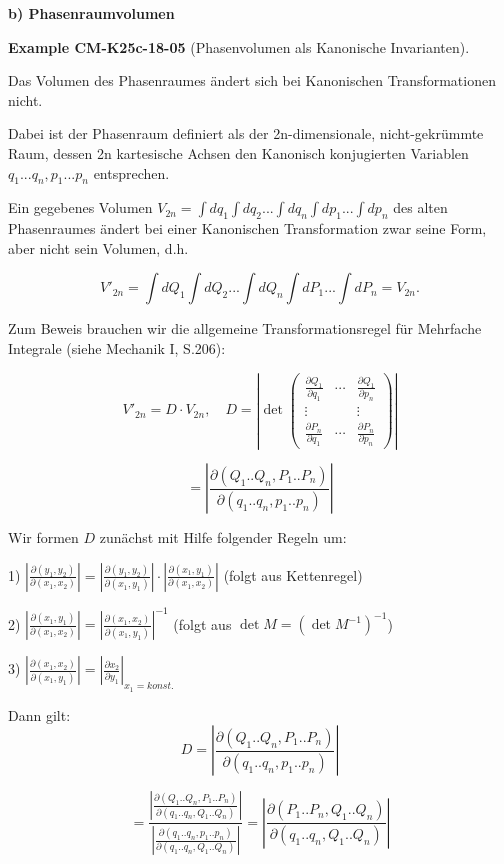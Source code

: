 \documentclass[10pt, letterpaper]{article}
\newcommand{\CustomHeading}[3]{%
  \par\medskip\noindent%
  \textbf{#1 #2} \textnormal{(#3)}.\enskip%
}
\newenvironment{EXA}[2]{\begin{unitbox}\CustomHeading{Example}{#1}{#2}}{\end{unitbox}}
\begin{document}
\textbf{b) Phasenraumvolumen}


\begin{EXA}{CM-K25c-18-05}{Phasenvolumen als Kanonische Invarianten}
Das Volumen des Phasenraumes ändert sich bei Kanonischen Transformationen nicht.


Dabei ist der Phasenraum definiert als der 2n-dimensionale, nicht-gekrümmte Raum, dessen 2n kartesische Achsen den Kanonisch konjugierten Variablen $q_1...q_n, p_1...p_n$ entsprechen.

Ein gegebenes Volumen $V_{2n} = \int dq_1 \int dq_2 ... \int dq_n \int dp_1 ... \int dp_n$ 
des alten Phasenraumes ändert bei einer Kanonischen Transformation 
zwar seine Form, aber nicht sein Volumen, d.h.

\[
V'_{2n} = \int dQ_1 \int dQ_2 ... \int dQ_n \int dP_1 ... \int dP_n = V_{2n}.
\]

Zum Beweis brauchen wir die allgemeine Transformationsregel 
für Mehrfache Integrale (siehe Mechanik I, S.206):

\[
V'_{2n} = D \cdot V_{2n}, \quad D = \left|\det\begin{pmatrix}
\frac{\partial Q_1}{\partial q_1} & \cdots & \frac{\partial Q_1}{\partial p_n} \\
\vdots & & \vdots \\
\frac{\partial P_n}{\partial q_1} & \cdots & \frac{\partial P_n}{\partial p_n}
\end{pmatrix}\right|
\]

\[
= \left|\frac{\partial(Q_1 .. Q_n, P_1 .. P_n)}{\partial(q_1 .. q_n, p_1 .. p_n)}\right|
\]

Wir formen $D$ zunächst mit Hilfe folgender Regeln um:

1) $\left|\frac{\partial(y_1,y_2)}{\partial(x_1,x_2)}\right| = \left|\frac{\partial(y_1,y_2)}{\partial(x_1,y_1)}\right| \cdot \left|\frac{\partial(x_1,y_1)}{\partial(x_1,x_2)}\right|$ (folgt aus Kettenregel)

2) $\left|\frac{\partial(x_1,y_1)}{\partial(x_1,x_2)}\right| = \left|\frac{\partial(x_1,x_2)}{\partial(x_1,y_1)}\right|^{-1}$ (folgt aus $\det M = (\det M^{-1})^{-1}$)

3) $\left|\frac{\partial(x_1,x_2)}{\partial(x_1,y_1)}\right| = \left|\frac{\partial x_2}{\partial y_1}\right|_{x_1=konst.}$

Dann gilt:
\[
D = \left|\frac{\partial(Q_1..Q_n,P_1..P_n)}{\partial(q_1..q_n,p_1..p_n)}\right|
\]

\[
= \frac{\left|\frac{\partial(Q_1..Q_n,P_1..P_n)}{\partial(q_1..q_n,Q_1..Q_n)}\right|}{\left|\frac{\partial(q_1..q_n,p_1..p_n)}{\partial(q_1..q_n,Q_1..Q_n)}\right|} = 
\left|\frac{\partial(P_1..P_n,Q_1..Q_n)}{\partial(q_1..q_n,Q_1..Q_n)}\right|
\]


\end{EXA}
\end{document}

